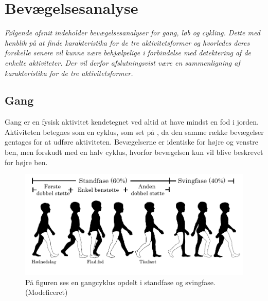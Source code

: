 \section{Bevægelsesanalyse} \label{bevaegelse}
%
\textit{Følgende afsnit indeholder bevægelsesanalyser for gang, løb og cykling. Dette med henblik på at finde karakteristika for de tre aktivitetsformer og hvorledes deres forskelle senere vil kunne være behjælpelige i forbindelse med detektering af de enkelte aktiviteter. Der vil derfor afslutningsvist være en sammenligning af karakteristika for de tre aktivitetsformer.}

\subsection{Gang}
Gang er en fysisk aktivitet kendetegnet ved altid at have mindst en fod i jorden. Aktiviteten betegnes som en cyklus, som set på , da den samme række bevægelser gentages for at udføre aktiviteten. Bevægelserne er identiske for højre og venstre ben, men forskudt med en halv cyklus, hvorfor bevægelsen kun vil blive beskrevet for højre ben. \citep{VaughanDavisOConnor1992,Whittle1990} 

\begin{figure}[H]
	\centering
	\includegraphics[scale=0.5]{figures/bProblemloesning/gang_cyklus.png}
	\caption{På figuren ses en gangcyklus opdelt i standfase og svingfase. \citep{VaughanDavisOConnor1992} (Modeficeret)}
	\label{fig:gang_cyklus}
\end{figure}
	
